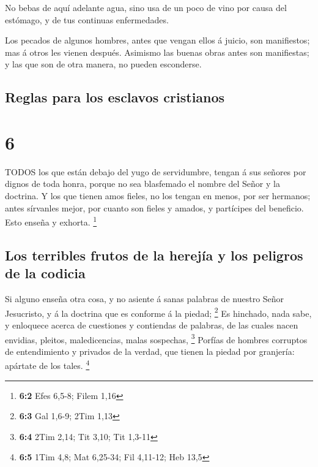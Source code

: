  No bebas de aquí adelante agua, sino usa de un poco de
vino por causa del estómago, y de tus continuas enfermedades.

 Los pecados de algunos hombres, antes que vengan ellos á
juicio, son manifiestos; mas á otros les vienen después. 
Asimismo las buenas obras antes son manifiestas; y las que son de otra
manera, no pueden esconderse.

\hypertarget{reglas-para-los-esclavos-cristianos}{%
\subsection{Reglas para los esclavos
cristianos}\label{reglas-para-los-esclavos-cristianos}}

\hypertarget{section-5}{%
\section{6}\label{section-5}}

 TODOS los que están debajo del yugo de servidumbre, tengan
á sus señores por dignos de toda honra, porque no sea blasfemado el
nombre del Señor y la doctrina.  Y los que tienen amos
fieles, no los tengan en menos, por ser hermanos; antes sírvanles mejor,
por cuanto son fieles y amados, y partícipes del beneficio. Esto enseña
y exhorta. \footnote{\textbf{6:2} Efes 6,5-8; Filem 1,16}

\hypertarget{los-terribles-frutos-de-la-herejuxeda-y-los-peligros-de-la-codicia}{%
\subsection{Los terribles frutos de la herejía y los peligros de la
codicia}\label{los-terribles-frutos-de-la-herejuxeda-y-los-peligros-de-la-codicia}}

 Si alguno enseña otra cosa, y no asiente á sanas palabras
de nuestro Señor Jesucristo, y á la doctrina que es conforme á la
piedad; \footnote{\textbf{6:3} Gal 1,6-9; 2Tim 1,13}  Es
hinchado, nada sabe, y enloquece acerca de cuestiones y contiendas de
palabras, de las cuales nacen envidias, pleitos, maledicencias, malas
sospechas, \footnote{\textbf{6:4} 2Tim 2,14; Tit 3,10; Tit 1,3-11}
 Porfías de hombres corruptos de entendimiento y privados de
la verdad, que tienen la piedad por granjería: apártate de los tales.
\footnote{\textbf{6:5} 1Tim 4,8; Mat 6,25-34; Fil 4,11-12; Heb 13,5}

